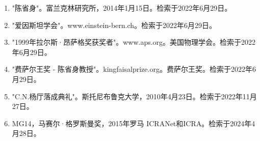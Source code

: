 \begin{enumerate}
\item "陈省身"。富兰克林研究所，2014年1月15日。检索于2022年6月29日。  
\item "爱因斯坦学会"。www.einstein-bern.ch。检索于2022年6月29日。  
\item "1999年拉尔斯·昂萨格奖获奖者"。www.aps.org。美国物理学会。检索于2022年6月29日。  
\item "费萨尔王奖 - 陈省身教授"。kingfaisalprize.org。费萨尔王奖。检索于2022年6月29日。  
\item "C.N.杨厅落成典礼"。斯托尼布鲁克大学，2010年4月23日。检索于2022年11月27日。  
\item MG14，马赛尔·格罗斯曼奖，2015年罗马 ICRANet和ICRA。检索于2024年4月28日。
\end{enumerate}